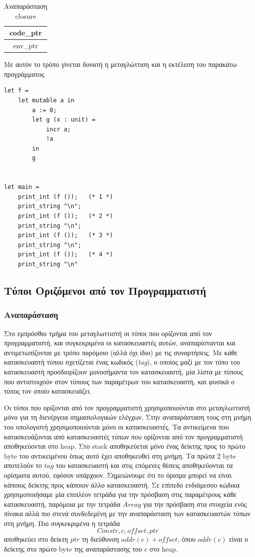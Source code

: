 \documentclass[12pt]{article}
\begin{document}
\begin{table}[htbp]
\centering
    \begin{tabular}{|c|}
    \hline
    code\_ptr \\ \hline
    env\_ptr  \\ \hline
    \end{tabular}
    \caption{Αναπαράσταση closure}
\end{table}


Με αυτόν το τρόπο γίνεται δυνατή η μεταγλώττιση και η εκτέλεση του παρακάτω προγράμματος

\begin{verbatim}
let f = 
    let mutable a in
        a := 0;
        let g (x : unit) =
            incr a;
            !a
        in
        g


let main = 
    print_int (f ());   (* 1 *)
    print_string "\n";
    print_int (f ());   (* 2 *)
    print_string "\n";
    print_int (f ());   (* 3 *)
    print_string "\n";
    print_int (f ());   (* 4 *)
    print_string "\n"
\end{verbatim}

\subsection{Τύποι Οριζόμενοι από τον Προγραμματιστή}
\subsubsection{Αναπαράσταση}
Στο εμπρόσθιο τμήμα του μεταγλωττιστή οι τύποι που ορίζονται από τον προγραμματιστή, και συγκεκριμένα οι κατασκευαστές αυτών, αναπαρίστανται και αντιμετωπίζονται με τρόπο παρόμοιο (αλλά όχι ίδιο) με τις συναρτήσεις. Με κάθε κατασκευαστή τύπου σχετίζεται ένας κωδικός (\textit{tag}), ο οποίος μαζί με τον τύπο του κατασκευαστή προσδιορίζουν μονοσήμαντα τον κατασκευαστή, μία λίστα με τύπους που αντιστοιχούν στον τύπους των παραμέτρων του κατασκευαστή, και φυσικά ο τύπος τον οποίο κατασκευάζει. 

Οι τύποι που ορίζονται από τον προγραμματιστή χρησιμοποιούνται στο μεταγλωττιστή μόνο για τη διενέργεια σημασιολογικών ελέγχων. Στην αναπαράσταση τους στη μνήμη του υπολογιστή χρησιμοποιούνται μόνο οι κατασκευαστές.
Τα αντικείμενα που κατασκευάζονται από κατασκευαστές τύπων που ορίζονται από τον προγραμματιστή αποθηκεύονται στο heap. Στο stack αποθηκεύεται μόνο ένας δείκτης προς το πρώτο byte του αντικειμένου όπως αυτό έχει αποθηκευθεί στη μνήμη. Τα πρώτα 2 byte αποτελούν το $tag$ του κατασκευαστή και στις επόμενες θέσεις αποθηκεύονται τα ορίσματα αυτού, εφόσον υπάρχουν. Σημειώνουμε ότι το όρισμα μπορεί να είναι κάποιος δείκτης προς κάποιον άλλο κατασκευαστή.
Σε επίπεδο ενδιάμεσου κώδικα χρησιμοποιήσαμε μία επιπλέον τετράδα για την πρόσβαση στις παραμέτρους κάθε κατασκευαστή, παρόμοια με την τετράδα $Array$ για την πρόσβαση στα στοιχεία ενός πίνακα αλλά πιο στενά συνδεδεμένη με την αναπαράσταση των κατασκευαστών τύπων στη μνήμη. Πιο συγκεκριμένα η τετράδα
$$ Constr, c, offset, ptr$$
αποθηκεύει στο δείκτη $ptr$ τη διεύθυνση $addr(c)+offset$, όπου $addr(c)$ είναι ο δείκτης στο πρώτο byte της αναπαράστασης του $c$ στο heap.
\end{document}
